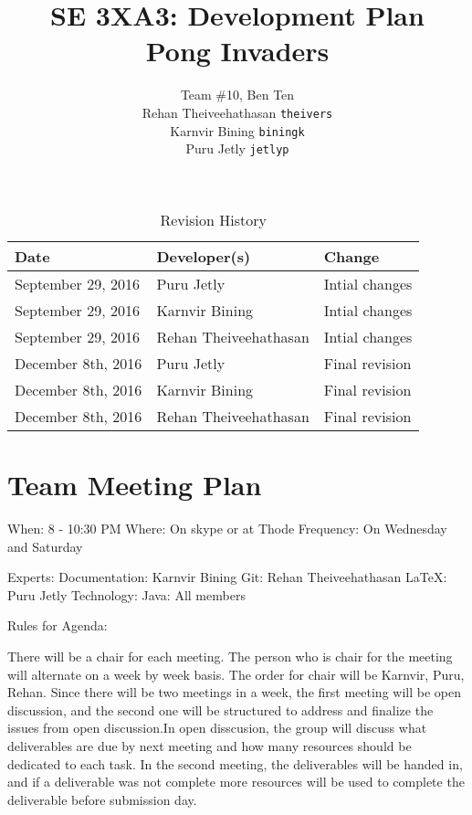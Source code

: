 \documentclass{article}
\title{SE 3XA3: Development Plan\\Pong Invaders}
\author{Team \#10, Ben Ten
		\\ Rehan Theiveehathasan	\texttt{theivers}
		\\ Karnvir Bining	\texttt{biningk}
		\\ Puru Jetly	\texttt{jetlyp}
}
\date{}
\begin{document}
\begin{table}[hp]
\caption{Revision History} \label{TblRevisionHistory}
\begin{tabularx}{\textwidth}{llX}
\toprule
\textbf{Date} & \textbf{Developer(s)} & \textbf{Change}\\
\midrule
September 29, 2016 & Puru Jetly & Intial changes\\
September 29, 2016 & Karnvir Bining & Intial changes\\
September 29, 2016 & Rehan Theiveehathasan & Intial changes\\
\midrule
December 8th, 2016 & Puru Jetly & Final revision\\
December 8th, 2016 & Karnvir Bining & Final revision\\
December 8th, 2016 & Rehan Theiveehathasan & Final revision\\
\bottomrule
\end{tabularx}
\end{table}
\newpage
\maketitle

\section{Team Meeting Plan}

When: 8 - 10:30 PM \newline
\newline
Where: On skype or at Thode\newline
\newline
Frequency: On Wednesday and Saturday\newline


\noindent Experts: \newline
\indent Documentation: Karnvir Bining\newline
\indent Git: Rehan Theiveehathasan\newline
\indent LaTeX: Puru Jetly\newline
\indent Technology: \newline
\indent  \indent Java: All members \newline

\noindent Rules for Agenda:\newline

\noindent There will be a chair for each meeting. The person who is chair for the meeting will alternate on a week by week basis. The order for chair will be Karnvir, Puru, Rehan. Since there will be two meetings in a week, the first meeting will be open discussion, and the second one will be structured to address and finalize the issues from open discussion.In open disscusion, the group will discuss what deliverables are due by next meeting  and how many resources should be dedicated to each task. In the second meeting, the deliverables will be handed in, and if a deliverable was not complete more resources will be used to complete the deliverable before submission day.
\end{document}
